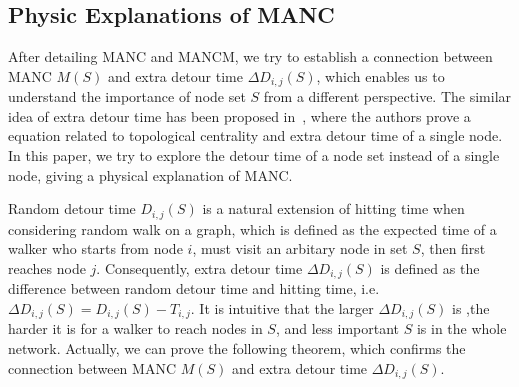 \documentclass[sigconf]{acmart}
\begin{document}
\subsection{Physic Explanations of MANC}

After detailing MANC and MANCM, we try to establish a connection between MANC \(M(S)\) and extra detour time \(\Delta D_{i,j}(S)\), which enables us to understand the importance of node set \(S\) from a different perspective. The similar idea of extra detour time has been proposed in~\cite{RaGyZh13}, where the authors prove a equation related to topological centrality and extra detour time of a single node. In this paper, we try to explore the detour time of a node set instead of a single node, giving a physical explanation of MANC.

Random detour time \(D_{i,j}(S)\) is a natural extension of hitting time when considering random walk on a graph, which is defined as the expected time of a walker who starts from node \(i\), must visit an arbitary node in set \(S\), then first reaches node \(j\). Consequently, extra detour time \(\Delta D_{i,j}(S)\) is defined as the difference between random detour time and hitting time, i.e. \(\Delta D_{i,j}(S)=D_{i,j}(S)-T_{i,j}\). It is intuitive that the larger \(\Delta D_{i,j}(S)\) is ,the harder it is for a walker to reach nodes in \(S\), and less important \(S\) is in the whole network. Actually, we can prove the following theorem, which confirms the connection between MANC \(M(S)\) and extra detour time \(\Delta D_{i,j}(S)\).
\end{document}
